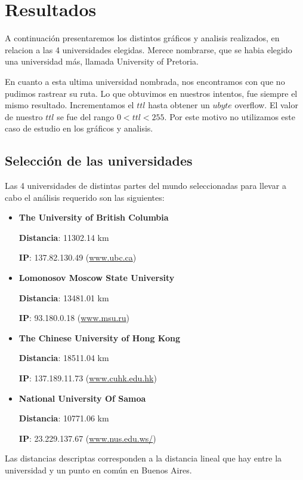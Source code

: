 \section{Resultados}	
A continuaci\'on presentaremos los distintos gr\'aficos y analisis realizados, en relacion a las 4 universidades elegidas. Merece nombrarse, que se habia elegido una universidad m\'as, llamada University of Pretoria.

En cuanto a esta ultima universidad nombrada, nos encontramos con que no pudimos rastrear su ruta. Lo que obtuvimos en nuestros intentos, fue siempre el mismo resultado. Incrementamos el $ttl$ hasta obtener un $ubyte$ overflow. El valor de nuestro $ttl$ se fue del rango $0 < ttl < 255$.
Por este motivo no utilizamos este caso de estudio en los gr\'aficos y analisis.


\subsection{Selección de las universidades}
Las 4 universidades de distintas partes del mundo seleccionadas para llevar a cabo el análisis requerido son las siguientes: 

\begin{itemize}
 \item {\bf The University of British Columbia}
 
	{\bf Distancia}: 11302.14 km 
	
	{\bf IP}: 137.82.130.49 (\url{www.ubc.ca}{})
 
 \item {\bf Lomonosov Moscow State University}

	{\bf Distancia}: 13481.01 km
	
	{\bf IP}: 93.180.0.18 (\url{www.msu.ru}{})
 
 \item {\bf The Chinese University of Hong Kong}

	{\bf Distancia}: 18511.04 km
	
	{\bf IP}: 137.189.11.73 (\url{www.cuhk.edu.hk})
 
 \item {\bf National University Of Samoa}
 
	{\bf Distancia}: 10771.06 km
	
	{\bf IP}: 23.229.137.67 (\url{www.nus.edu.ws/}{})
 
\end{itemize}

Las distancias descriptas corresponden a la distancia lineal que hay entre la universidad y un punto en común en Buenos Aires.


